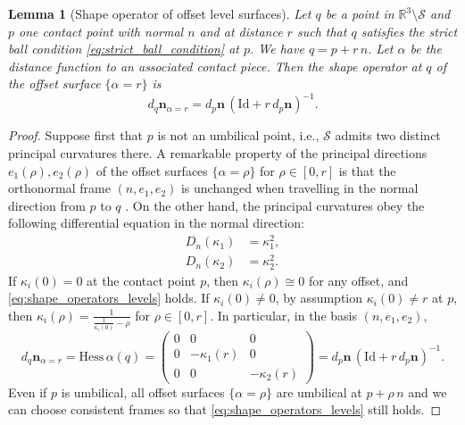 \documentclass[11pt]{article}
\newcommand{\R}{\mathbb{R}}
\newcommand{\nbf}{\mathbf{n}}
\newcommand{\kap}{\kappa}
\newcommand{\Surf}{\mathcal{S}}
\newcommand{\Hess}{\mathrm{Hess}}
\newcommand{\Id}{\mathrm{Id}}
\theoremstyle{plain}
\newtheorem{lem}{Lemma}
\theoremstyle{definition}
\theoremstyle{remark}
\begin{document}
	
	\begin{lem}[Shape operator of offset level surfaces]
		\label{lem:shape_operators_levels}
		Let $q$ be a point in $\R^3 \setminus \Surf$ and $p$ one contact point with normal $n$ and at distance $r$ such that $q$ satisfies the strict ball condition  \eqref{eq:strict_ball_condition} at $p$. We have $q = p + r\,n$. Let $\alpha$ be the distance function to an associated contact piece.
		Then the shape operator at $q$ of the offset surface $\{\alpha = r\}$ is
		\begin{equation}
			\label{eq:shape_operators_levels}
			d_q \nbf_{\alpha = r} = d_{p} \nbf \, (\Id + r \, d_{p} \nbf )^{-1}.
		\end{equation}
	\end{lem}
	\begin{proof}
		Suppose first that $p$ is not an umbilical point, i.e., $\Surf$ admits two distinct principal curvatures there. A remarkable property of the principal directions $e_1(\rho), e_2(\rho)$ of the offset surfaces $\{\alpha = \rho\}$ for $\rho \in [0,r]$ is that the orthonormal frame $(n, e_1, e_2)$ is unchanged when travelling in the normal direction from $p$ to $q$ \citep{mayost_applications_2014}. On the other hand, the principal curvatures obey the following differential equation in the normal direction:
		\begin{align*}
			D_n(\kap_1) &= \kap_1^2, \\
			D_n(\kap_2) &= \kap_2^2.
		\end{align*}
		If $\kap_i(0) = 0$ at the contact point $p$, then $\kap_i(\rho) \cong 0$ for any offset, and \cref{eq:shape_operators_levels} holds. If $\kap_i(0) \neq 0$, by assumption $\kap_i(0) \neq r$ at $p$, then $\kap_i(\rho) = \frac{1}{\frac{1}{\kap_i(0)} - \rho}$ for $\rho \in [0,r]$. In particular,
		in the basis $(n, e_1, e_2)$,
		\[d_q \nbf_{\alpha = r} = \Hess \, \alpha (q) = 
		\begin{pmatrix}
			0 & 0 & 0 \\
			0 & -\kap_1(r) & 0 \\
			0 & 0 & -\kap_2(r) 
		\end{pmatrix} = d_{p} \nbf \, (\Id + r \, d_{p} \nbf )^{-1}.\]
		Even if $p$ is umbilical, all offset surfaces $\{\alpha = \rho\}$ are umbilical at $p + \rho \, n$ and we can choose consistent frames so that \cref{eq:shape_operators_levels} still holds.
	\end{proof}
	
\end{document}
